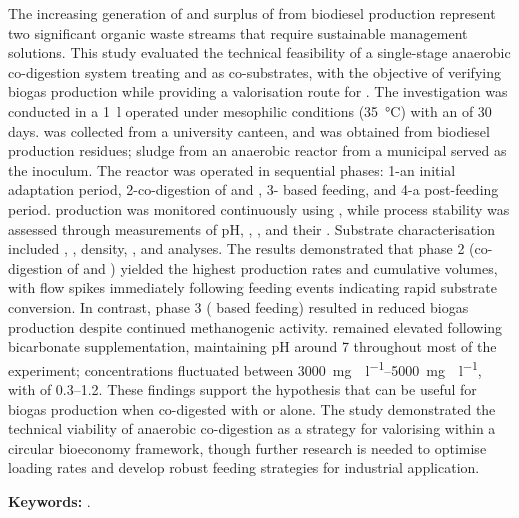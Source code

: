 \label{ch:abstract}

The increasing generation of  and surplus of  from biodiesel production represent two significant organic waste streams that require sustainable management solutions. This study evaluated the technical feasibility of a single-stage anaerobic co-digestion system treating  and  as co-substrates, with the objective of verifying biogas production while providing a valorisation route for . The investigation was conducted in a \qty{1}{\litre}  operated under mesophilic conditions (\qty{35}{\celsius}) with an  of \num{30} days.  was collected from a university canteen, and  was obtained from biodiesel production residues; sludge from an anaerobic reactor from a municipal  served as the inoculum. The reactor was operated in sequential phases: 1-an initial adaptation period, 2-co-digestion of  and , 3- based feeding, and 4-a post-feeding period.  production was monitored continuously using , while process stability was assessed through measurements of pH, , , and their . Substrate characterisation included , , density, , and  analyses. The results demonstrated that phase 2 (co-digestion of  and ) yielded the highest  production rates and cumulative volumes, with flow spikes immediately following feeding events indicating rapid substrate conversion. In contrast, phase 3 ( based feeding) resulted in reduced biogas production despite continued methanogenic activity.  remained elevated following bicarbonate supplementation, maintaining pH around \num{7} throughout most of the experiment;  concentrations fluctuated between \qtyrange{3000}{5000}{\milli\gram\CHCOOH\per\litre}, with  of \numrange{0.3}{1.2}. These findings support the hypothesis that  can be useful for biogas production when co-digested with  or alone. The study demonstrated the technical viability of anaerobic co-digestion as a strategy for valorising  within a circular bioeconomy framework, though further research is needed to optimise  loading rates and develop robust feeding strategies for industrial application.

\vspace{1em}
\noindent\textbf{Keywords:} \Keywords.
